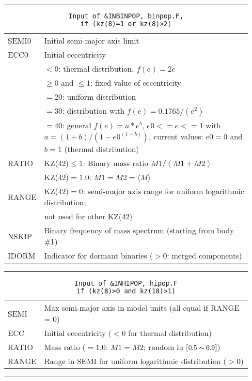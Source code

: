 \hrule
\noindent
\begin{longtable}{@{}p{1.5cm}p{13.0cm}}
\caption{\texttt{Input of \&INBINPOP, binpop.F, \\\phantom{xxxxxxxx}if (kz(8)=1 or kz(8)>2)}}
\label{table:inbinpop}\\\hline
%
SEMI0   & Initial semi-major axis limit\\
ECC0    & Initial eccentricity \\
        & $<0$: thermal distribution, $f(e)=2e$ \\
        & $\ge 0$ and $\le 1$: fixed value of eccentricity\\
        & $=20$: uniform distribution \\
        & $=30$: distribution with $f(e)=0.1765/(e^2)$ \\
        & $=40$: general $f(e)=a*e^b$, $e0<=e<=1$ with $a=(1+b)/(1-e0^{(1+b)})$, current values: $e0=0$ and $b=1$ (thermal distribution) \\
RATIO   & KZ(42)$\le 1$: Binary mass ratio $M1/(M1 + M2)$\\
        & KZ(42)$=1.0$: $M1 = M2 = \langle M \rangle$\\
RANGE   & KZ(42)$=0$: semi-major axis range for uniform logarithmic distribution; \\
        & not used for other KZ(42)\\
NSKIP   & Binary frequency of mass spectrum (starting from body \#1)\\
IDORM   & Indicator for dormant binaries ($>0$: merged components)\\
\end{longtable}

\hrule
\noindent
\begin{longtable}{@{}p{1.5cm}p{13.0cm}}
\caption{\texttt{Input of \&INHIPOP, hipop.F\\\phantom{xxxxxxx} if (kz(8)>0 and kz(18)>1)}}
\label{table:inhipop}\\\hline
%
SEMI  &  Max semi-major axis in model units (all equal if RANGE = 0) \\
ECC   &  Initial eccentricity ($<0$ for thermal distribution) \\
RATIO &  Mass ratio ($= 1.0$: $M1 = M2$; random in [$0.5\thicksim0.9$]) \\
RANGE &  Range in SEMI for uniform logarithmic distribution ($> 0$) \\
\end{longtable}

\hrule
\noindent

